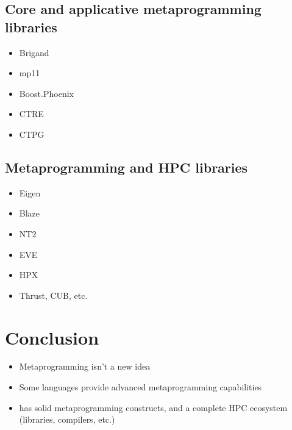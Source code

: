 \documentclass[../../main.tex]{subfiles}
\begin{document}
\subsection{Core and applicative metaprogramming libraries}

\begin{itemize}
\item Brigand

\item mp11
\end{itemize}


\begin{itemize}
\item Boost.Phoenix

\item CTRE

\item CTPG
\end{itemize}

\subsection{Metaprogramming and HPC libraries}

\begin{itemize}
\item Eigen

\item Blaze

\item NT2

\item EVE

\item HPX

\item Thrust, CUB, etc.
\end{itemize}

\section{Conclusion}

\begin{itemize}
\item Metaprogramming isn't a new idea

\item Some languages provide advanced metaprogramming capabilities

\item \cpp has solid metaprogramming constructs, and a complete HPC ecosystem
(libraries, compilers, etc.)
\end{itemize}
\end{document}
